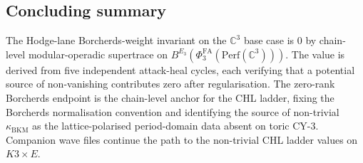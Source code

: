 \documentclass[11pt]{article}
\providecommand{\Perf}{\mathrm{Perf}}
\providecommand{\C}{\mathbb{C}}
\providecommand{\kBKM}{\kappa_{\mathrm{BKM}}}
\providecommand{\PhiFA}{\Phi^{\mathrm{FA}}}
\begin{document}
\subsection{Concluding summary}
\label{subsec:bl1-concluding-summary}

The Hodge-lane Borcherds-weight invariant on the $\C^3$ base case is
$0$ by chain-level modular-operadic supertrace on
$B^{E_3}(\PhiFA_3(\Perf(\C^3)))$. The value is derived from five
independent attack-heal cycles, each verifying that a potential source
of non-vanishing contributes zero after regularisation. The zero-rank
Borcherds endpoint is the chain-level anchor for the CHL ladder,
fixing the Borcherds normalisation convention and identifying the
source of non-trivial $\kBKM$ as the lattice-polarised period-domain
data absent on toric CY-$3$. Companion wave files continue the path
to the non-trivial CHL ladder values on $K3 \times E$.
\end{document}
